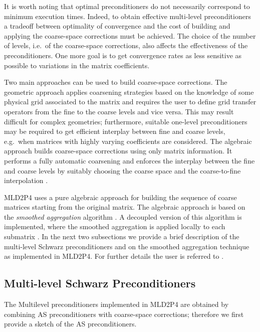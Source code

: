 It is worth noting that optimal preconditioners do not necessarily correspond
to minimum execution times. Indeed, to obtain effective multi-level preconditioners
a tradeoff between optimality of convergence and the cost of building and applying
the coarse-space corrections must be achieved. The choice of the number of levels,
i.e.\ of the coarse-space corrections, also affects the effectiveness of the
preconditioners. One more goal is to get convergence rates as less sensitive
as possible to variations in the matrix coefficients.

Two main approaches can be used to build coarse-space corrections. The geometric approach
applies coarsening strategies based on the knowledge of some physical grid associated
to the matrix and requires the user to define grid transfer operators from the fine
to the coarse levels and vice versa. This may result difficult for complex geometries;
furthermore, suitable one-level preconditioners may be required to get efficient
interplay between fine and coarse levels, e.g.\ when matrices with highly varying coefficients
are considered. The algebraic approach builds coarse-space corrections using only matrix
information. It performs a fully automatic coarsening and enforces the interplay between
the fine and coarse levels by suitably choosing the coarse space and the coarse-to-fine
interpolation \cite{StubenGMD69_99}.

MLD2P4 uses a pure algebraic approach for building the sequence of coarse matrices
starting from the original matrix. The algebraic approach is based on the \emph{smoothed 
aggregation} algorithm \cite{BREZINA_VANEK,VANEK_MANDEL_BREZINA}. A decoupled version
of this algorithm is implemented, where the smoothed aggregation is applied locally
to each submatrix \cite{TUMINARO_TONG}. In the next two subsections we provide
a brief description of the multi-level Schwarz preconditioners and on the smoothed
aggregation technique as implemented in MLD2P4. For further details the user
is referred to \cite{para_04,aaecc_07,apnum_07,dd2_96}.


\subsection{Multi-level Schwarz Preconditioners\label{sec:multilevel}}

The Multilevel preconditioners implemented in MLD2P4 are obtained by combining
AS preconditioners with coarse-space corrections; therefore
we first provide a sketch of the AS preconditioners.

